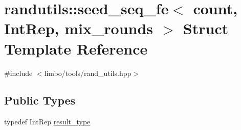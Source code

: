 \hypertarget{structrandutils_1_1seed__seq__fe}{}\section{randutils\+:\+:seed\+\_\+seq\+\_\+fe$<$ count, Int\+Rep, mix\+\_\+rounds $>$ Struct Template Reference}
\label{structrandutils_1_1seed__seq__fe}


{\ttfamily \#include $<$limbo/tools/rand\+\_\+utils.\+hpp$>$}

\subsection*{Public Types}
\begin{DoxyCompactItemize}
\item 
typedef Int\+Rep \hyperlink{structrandutils_1_1seed__seq__fe_ae485fbabe93091ea392c3bf777e64279}{result\+\_\+type}
\end{DoxyCompactItemize}
